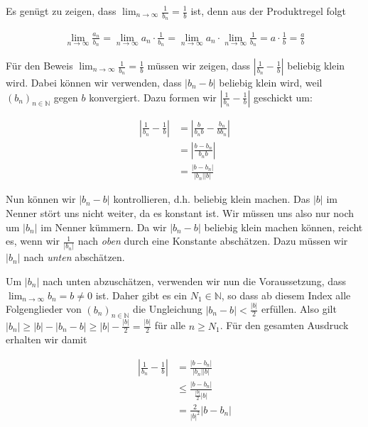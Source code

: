 \documentclass[fontsize=9pt,
               parskip=half-,
               DIV=14,
               listof=chapterentry,
               tocflat]{scrbook}
\begin{document}
\begin{solutionprocess*}
Es genügt zu zeigen, dass $\lim _{n\to \infty }{\tfrac {1}{b_{n}}}={\tfrac {1}{b}}$ ist, denn aus der Produktregel folgt

\begin{align*}
\lim _{n\to \infty }{\tfrac {a_{n}}{b_{n}}}=\lim _{n\to \infty }a_{n}\cdot {\tfrac {1}{b_{n}}}=\lim _{n\to \infty }a_{n}\cdot \lim _{n\to \infty }{\tfrac {1}{b_{n}}}=a\cdot {\tfrac {1}{b}}={\tfrac {a}{b}}
\end{align*}

Für den Beweis $\lim _{n\to \infty }{\tfrac {1}{b_{n}}}={\tfrac {1}{b}}$ müssen wir zeigen, dass $|{\tfrac {1}{b_{n}}}-{\tfrac {1}{b}}|$ beliebig klein wird. Dabei können wir verwenden, dass $|b_{n}-b|$ beliebig klein wird, weil $(b_{n})_{n\in \mathbb {N} }$ gegen $b$ konvergiert. Dazu formen wir $|{\tfrac {1}{b_{n}}}-{\tfrac {1}{b}}|$ geschickt um:

\begin{align*}
\left|{\frac {1}{b_{n}}}-{\frac {1}{b}}\right|&=\left|{\frac {b}{b_{n}b}}-{\frac {b_{n}}{bb_{n}}}\right|\\[0.3em]&=\left|{\frac {b-b_{n}}{b_{n}b}}\right|\\[0.3em]&={\frac {|b-b_{n}|}{|b_{n}||b|}}
\end{align*}

Nun können wir $|b_{n}-b|$ kontrollieren, d.h. beliebig klein machen. Das $|b|$ im Nenner stört uns nicht weiter, da es konstant ist. Wir müssen uns also nur noch um $|b_{n}|$ im Nenner kümmern. Da wir $|b_{n}-b|$ beliebig klein machen können, reicht es, wenn wir ${\tfrac {1}{|b_{n}|}}$ nach \emph{oben} durch eine Konstante abschätzen. Dazu müssen wir $|b_{n}|$ nach \emph{unten} abschätzen.

Um $|b_{n}|$ nach unten abzuschätzen, verwenden wir nun die Voraussetzung, dass $\lim _{n\to \infty }b_{n}=b\neq 0$ ist. Daher gibt es ein $N_{1}\in \mathbb {N} $, so dass ab diesem Index alle Folgenglieder von $(b_{n})_{n\in \mathbb {N} }$ die Ungleichung $|b_{n}-b|<{\tfrac {|b|}{2}}$ erfüllen. Also gilt $|b_{n}|\geq |b|-|b_{n}-b|\geq |b|-{\tfrac {|b|}{2}}={\tfrac {|b|}{2}}$ für alle $n\geq N_{1}$. Für den gesamten Ausdruck erhalten wir damit

\begin{align*}
\left|{\frac {1}{b_{n}}}-{\frac {1}{b}}\right|&={\frac {|b-b_{n}|}{|b_{n}||b|}}\\[0.5em]&\leq {\frac {|b-b_{n}|}{{\tfrac {|b|}{2}}|b|}}\\[0.5em]&={\frac {2}{|b|^{2}}}|b-b_{n}|
\end{align*}


\end{solutionprocess*}
\end{document}
